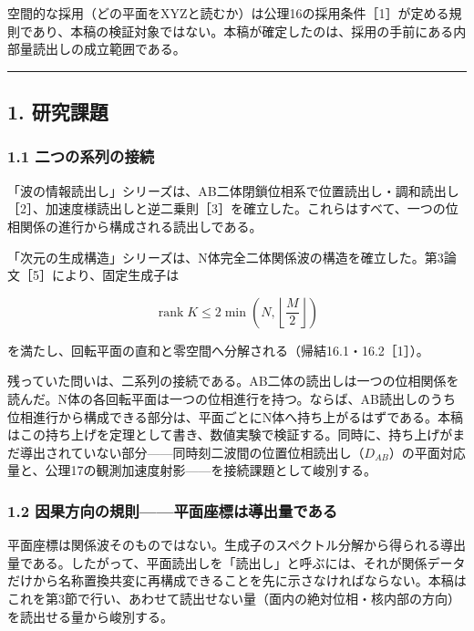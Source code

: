 \documentclass[
  a4paper,
]{ltjsarticle}
\begin{document}
空間的な採用（どの平面をXYZと読むか）は公理16の採用条件［1］が定める規則であり、本稿の検証対象ではない。本稿が確定したのは、採用の手前にある内部量読出しの成立範囲である。

\begin{center}\rule{0.5\linewidth}{0.5pt}\end{center}

\subsection{1. 研究課題}\label{ux7814ux7a76ux8ab2ux984c}

\subsubsection{1.1
二つの系列の接続}\label{ux4e8cux3064ux306eux7cfbux5217ux306eux63a5ux7d9a}

「波の情報読出し」シリーズは、AB二体閉鎖位相系で位置読出し・調和読出し［2］、加速度様読出しと逆二乗則［3］を確立した。これらはすべて、一つの位相関係の進行から構成される読出しである。

「次元の生成構造」シリーズは、N体完全二体関係波の構造を確立した。第3論文［5］により、固定生成子は

\[
\operatorname{rank}K\le2\min\!\left(N,\left\lfloor\frac{M}{2}\right\rfloor\right)
\]

を満たし、回転平面の直和と零空間へ分解される（帰結16.1・16.2［1］）。

残っていた問いは、二系列の接続である。AB二体の読出しは一つの位相関係を読んだ。N体の各回転平面は一つの位相進行を持つ。ならば、AB読出しのうち位相進行から構成できる部分は、平面ごとにN体へ持ち上がるはずである。本稿はこの持ち上げを定理として書き、数値実験で検証する。同時に、持ち上げがまだ導出されていない部分------同時刻二波間の位置位相読出し（\(D_{AB}\)）の平面対応量と、公理17の観測加速度射影------を接続課題として峻別する。

\subsubsection{1.2
因果方向の規則------平面座標は導出量である}\label{ux56e0ux679cux65b9ux5411ux306eux898fux5247ux5e73ux9762ux5ea7ux6a19ux306fux5c0eux51faux91cfux3067ux3042ux308b}

平面座標は関係波そのものではない。生成子のスペクトル分解から得られる導出量である。したがって、平面読出しを「読出し」と呼ぶには、それが関係データだけから名称置換共変に再構成できることを先に示さなければならない。本稿はこれを第3節で行い、あわせて読出せない量（面内の絶対位相・核内部の方向）を読出せる量から峻別する。
\end{document}
